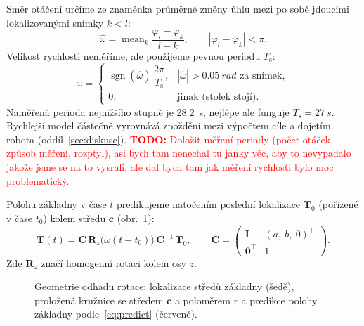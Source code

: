 \documentclass[11pt,a4paper]{article}
\newcommand{\todo}[1]{\textcolor{red}{\textbf{TODO:} #1}}
\newcommand{\R}{\mathbf{R}}
\newcommand{\T}{\mathbf{T}}
\begin{document}
Směr otáčení určíme ze znaménka průměrné změny úhlu mezi po sobě jdoucími
lokalizovanými snímky $k<l$:
\begin{equation}
  \hat\omega = \operatorname{mean}_{k}\frac{\varphi_l - \varphi_k}{l - k},
  \qquad |\varphi_l - \varphi_k| < \pi.
\end{equation}
Velikost rychlosti neměříme, ale použijeme pevnou periodu $T_\mathrm{s}$:
\begin{equation}
  \omega = \begin{cases}
    \operatorname{sgn}(\hat\omega)\,\dfrac{2\pi}{T_\mathrm{s}}, & |\hat\omega| > \SI{0,05}{rad} \text{ za snímek},\\[1ex]
    0, & \text{jinak (stolek stojí)}.
  \end{cases}
\end{equation}
Naměřená perioda nejnižšího stupně je \SI{28,2}{s}, nejlépe ale funguje
$T_\mathrm{s} = \SI{27}{s}$. Rychlejší model částečně vyrovnává zpoždění
mezi výpočtem cíle a dojetím robota (oddíl~\ref{sec:diskuse}).
\todo{Doložit měření periody (počet otáček, způsob měření, rozptyl), asi bych
tam nenechal tu janky věc, aby to nevypadalo jakože jsme se na to vysrali,
ale dal bych tam jak měření rychlosti bylo moc problematický.}

Polohu základny v čase $t$ predikujeme natočením poslední lokalizace
$\T_0$ (pořízené v čase $t_0$) kolem středu $\mathbf{c}$ (obr.~\ref{fig:geometry}):
\begin{equation}
  \T(t) = \mathbf{C}\,\R_z\!\big(\omega(t-t_0)\big)\,\mathbf{C}^{-1}\,\T_0,
  \qquad
  \mathbf{C} = \begin{pmatrix} \mathbf{I} & (a,\ b,\ 0)^\top \\ \mathbf{0}^\top & 1 \end{pmatrix}.
  \label{eq:predict}
\end{equation}
Zde $\R_z$ značí homogenní rotaci kolem osy $z$.

\begin{figure}[H]
  \centering
  \caption{Geometrie odhadu rotace: lokalizace středů základny (šedě), proložená
  kružnice se středem $\mathbf{c}$ a poloměrem $r$ a predikce polohy základny
  podle~\eqref{eq:predict} (červeně).}
  \label{fig:geometry}
\end{figure}
\end{document}
